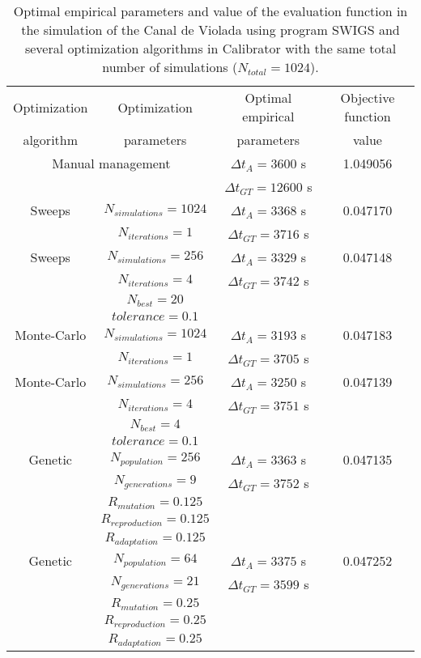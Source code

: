 \documentclass[review,authoryear]{elsarticle}
\newcommand{\TABLE}[5]
{
	\begin{table}[ht!]
		\centering
		\caption{#4.\label{#5}}
		#1
		\begin{tabular}{#2}
			#3
		\end{tabular}
	\end{table}
}
\begin{document}
\TABLE{\scriptsize}{cccc}
{
	Optimization & Optimization & Optimal empirical & Objective function
	\\ algorithm & parameters & parameters & value
	\\ \hline
	\multicolumn{2}{c}{Manual management} & $\Delta t_A=3600$ s & 1.049056
	\\ & & $\Delta t_{GT}=12600$ s
	\\ \hline
	Sweeps & $N_{simulations}=1024$ & $\Delta t_A=3368$ s & 0.047170
	\\ & $N_{iterations}=1$ & $\Delta t_{GT}=3716$ s
	\\ \hline
	Sweeps & $N_{simulations}=256$ & $\Delta t_A=3329$ s & 0.047148
	\\ & $N_{iterations}=4$ & $\Delta t_{GT}=3742$ s
	\\ & $N_{best}=20$ &
	\\ & $tolerance=0.1$
	\\ \hline
	Monte-Carlo & $N_{simulations}=1024$ & $\Delta t_A=3193$ s & 0.047183
	\\ & $N_{iterations}=1$ & $\Delta t_{GT}=3705$ s
	\\ \hline
	Monte-Carlo & $N_{simulations}=256$ & $\Delta t_A=3250$ s & 0.047139
	\\ & $N_{iterations}=4$ & $\Delta t_{GT}=3751$ s
	\\ & $N_{best}=4$
	\\ & $tolerance=0.1$
	\\ \hline
	Genetic & $N_{population}=256$ & $\Delta t_A=3363$ s & 0.047135
	\\ & $N_{generations}=9$ & $\Delta t_{GT}=3752$ s
	\\ & $R_{mutation}=0.125$
	\\ & $R_{reproduction}=0.125$
	\\ & $R_{adaptation}=0.125$
	\\ \hline
	Genetic & $N_{population}=64$ & $\Delta t_A=3375$ s & 0.047252
	\\ & $N_{generations}=21$ & $\Delta t_{GT}=3599$ s
	\\ & $R_{mutation}=0.25$
	\\ & $R_{reproduction}=0.25$
	\\ & $R_{adaptation}=0.25$
	\\ \hline
}{Optimal empirical parameters and value of the evaluation function in the simulation of the Canal de Violada using program SWIGS and several optimization algorithms in Calibrator with the same total number of simulations ($N_{total}=1024$)}
{TabSwigs}
\end{document}
